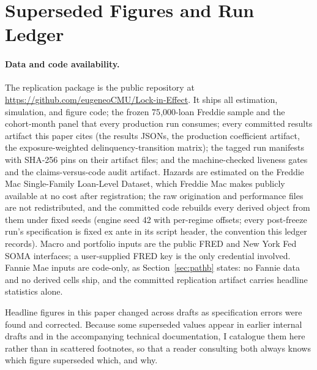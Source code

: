 \documentclass[12pt]{article}
\begin{document}
\newpage
\appendix

\section{Superseded Figures and Run Ledger}\label{app:ledger}

\paragraph{Data and code availability.} The replication package is the public repository at \url{https://github.com/eugeneoCMU/Lock-in-Effect}. It ships all estimation, simulation, and figure code; the frozen 75{,}000-loan Freddie sample and the cohort-month panel that every production run consumes; every committed results artifact this paper cites (the results JSONs, the production coefficient artifact, the exposure-weighted delinquency-transition matrix); the tagged run manifests with SHA-256 pins on their artifact files; and the machine-checked liveness gates and the claims-versus-code audit artifact. Hazards are estimated on the Freddie Mac Single-Family Loan-Level Dataset, which Freddie Mac makes publicly available at no cost after registration; the raw origination and performance files are not redistributed, and the committed code rebuilds every derived object from them under fixed seeds (engine seed 42 with per-regime offsets; every post-freeze run's specification is fixed ex ante in its script header, the convention this ledger records). Macro and portfolio inputs are the public FRED and New York Fed SOMA interfaces; a user-supplied FRED key is the only credential involved. Fannie Mae inputs are code-only, as Section~\ref{sec:pathb} states: no Fannie data and no derived cells ship, and the committed replication artifact carries headline statistics alone.

Headline figures in this paper changed across drafts as specification errors were found and corrected. Because some superseded values appear in earlier internal drafts and in the accompanying technical documentation, I catalogue them here rather than in scattered footnotes, so that a reader consulting both always knows which figure superseded which, and why.
\end{document}
